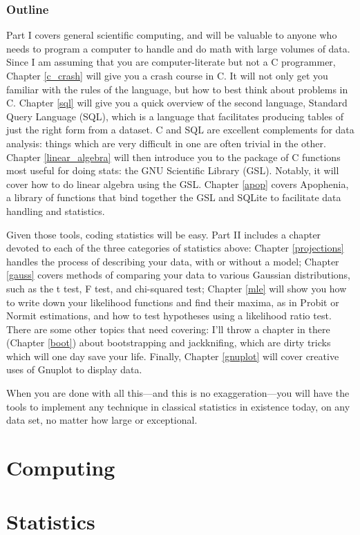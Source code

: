 \documentclass[12pt,notitlepage, openany]{book}
\begin{document}



\section{Outline} 
Part I covers general scientific computing, and will be valuable to
anyone who needs to program a computer to handle and do math with large volumes of data.
Since I am assuming that you are computer-literate but
not a C programmer, Chapter \ref{c_crash} will give you a crash course
in C. It will not only get you familiar with the rules of the language,
but how to best think about problems in C. 
Chapter \ref{sql} will give you a quick overview of the second language,
Standard Query Language (SQL), which is a language that facilitates
producing tables of just the right form from a dataset. C and SQL are
excellent complements for data analysis: things which are very difficult
in one are often trivial in the other.
Chapter \ref{linear_algebra}
will then introduce you to the package of C functions most useful for
doing stats: the GNU Scientific Library (GSL). Notably, it will cover
how to do linear algebra using the GSL. Chapter \ref{apop} covers
Apophenia, a library of functions that bind together the GSL and SQLite
to facilitate data handling and statistics.


Given those tools, coding statistics will be easy. Part II includes a chapter
devoted to each of the three categories of statistics above: Chapter \ref{projections}
handles the process of describing your data, with or without a model; Chapter
\ref{gauss} covers methods of comparing your data to various Gaussian
distributions, such as the t test, F test, and chi-squared test; Chapter
\ref{mle} will show you how to write down your likelihood functions and
find their maxima, as in Probit or Normit estimations, and how to test
hypotheses using a likelihood ratio test. There are some other topics
that need covering: I'll throw a chapter in there (Chapter \ref{boot})
about bootstrapping and jackknifing, which are dirty tricks which will one
day save your life.  Finally, Chapter \ref{gnuplot} will cover creative
uses of Gnuplot to display data.

When you are done with all this---and this is no exaggeration---you will
have the tools to implement any technique in classical statistics in
existence today, on any data set, no matter how large or exceptional.

\part{Computing}




\part{Statistics}




%

\nocite{*}


\printindex
\end{document}
